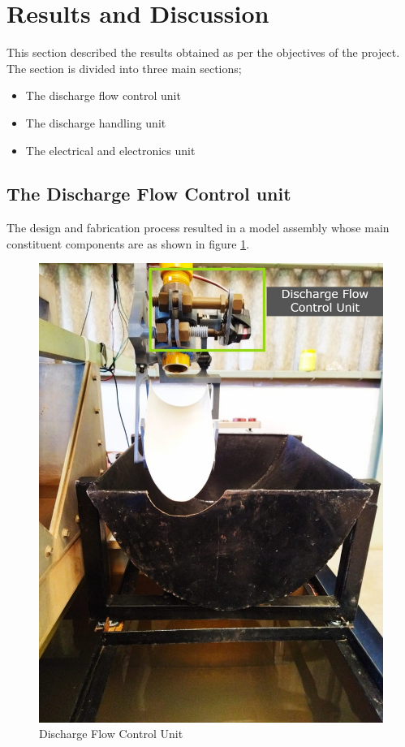 \section{Results and Discussion}
\par
This section described the results obtained as per the objectives of the project. The section is divided into three main sections;
\begin{itemize}
    \item The discharge flow control unit
    \item The discharge handling unit
    \item The electrical and electronics unit
\end{itemize}
\subsection{The Discharge Flow Control unit}
\par 
The design and fabrication process resulted in a  model assembly whose main constituent components are as shown in figure \ref{fig:Discharge Flow Control Unit}.
\begin{figure}[H]
            \centering
            \includegraphics[width=.85\textwidth]{Figures/flow control Results.jpg}
            \caption{Discharge Flow Control Unit}
            \label{fig:Discharge Flow Control Unit}
        \end{figure}
